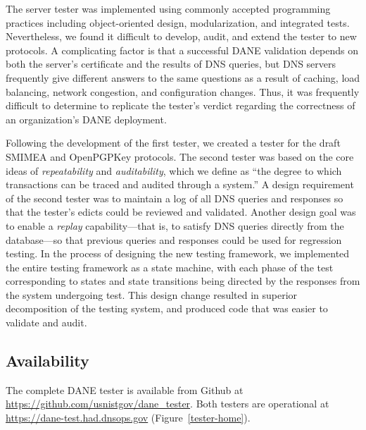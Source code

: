 \documentclass[preprint,3p,11pt]{elsarticle}
\begin{document}
The server tester was implemented using commonly accepted
programming practices including object-oriented design,
modularization, and integrated tests. Nevertheless, we found
it difficult to develop, audit, and extend the tester to new protocols. A 
complicating factor is that a successful DANE validation depends on both the server's certificate and the results of DNS
queries, but DNS servers frequently give different answers to the same
questions as a result of caching, load balancing, network congestion,
and configuration changes. Thus, it was frequently difficult to
determine to replicate the tester's verdict regarding the correctness
of an organization's DANE deployment.

Following the development of the first tester, we created a
tester for the draft SMIMEA and OpenPGPKey protocols. The second
tester was based on the core ideas of \emph{repeatability} and \emph{auditability},
which we define as ``the degree to which transactions can be traced
and audited through a system.'' A design requirement of the second tester  was to maintain a log of all DNS queries and responses
so that the tester's edicts could be reviewed and validated. Another
design goal was to enable a \emph{replay} capability---that is, to
satisfy DNS queries directly from the database---so that previous
queries and responses could be used for regression testing. In the
process of designing the new testing framework, we implemented the entire
testing framework as a state machine, with each phase
of the test corresponding to states and state transitions being
directed by the responses from the system undergoing test. This design
change resulted in superior decomposition of the testing system,
and produced code that was easier to validate and audit.

\subsection{Availability}

The complete DANE tester is available from Github at
\url{https://github.com/usnistgov/dane_tester}. Both testers are
operational at \url{https://dane-test.had.dnsops.gov} (Figure~\ref{tester-home}).

\newcommand\sgraphic[2]{
\begin{figure}
\begin{center}
\texttt{[image: \#1]}
\end{center}
\caption{#2}\label{#1}
\end{figure}
}
\end{document}
